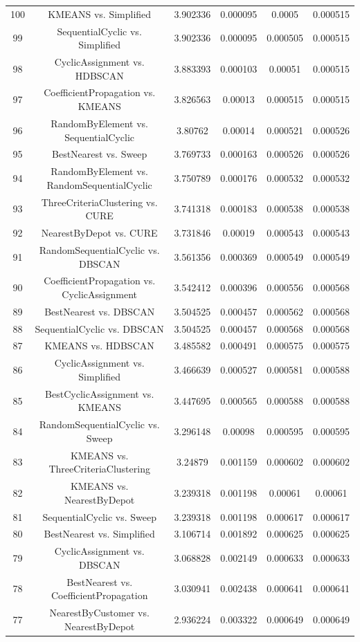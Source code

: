\documentclass[a4paper,10pt]{article}
\begin{document}
\begin{landscape}
\begin{table}[!htp]
\begin{tabular}{cccccc}
100&KMEANS vs. Simplified&3.902336&0.000095&0.0005&0.000515\\
99&SequentialCyclic vs. Simplified&3.902336&0.000095&0.000505&0.000515\\
98&CyclicAssignment vs. HDBSCAN&3.883393&0.000103&0.00051&0.000515\\
97&CoefficientPropagation vs. KMEANS&3.826563&0.00013&0.000515&0.000515\\
96&RandomByElement vs. SequentialCyclic&3.80762&0.00014&0.000521&0.000526\\
95&BestNearest vs. Sweep&3.769733&0.000163&0.000526&0.000526\\
94&RandomByElement vs. RandomSequentialCyclic&3.750789&0.000176&0.000532&0.000532\\
93&ThreeCriteriaClustering vs. CURE&3.741318&0.000183&0.000538&0.000538\\
92&NearestByDepot vs. CURE&3.731846&0.00019&0.000543&0.000543\\
91&RandomSequentialCyclic vs. DBSCAN&3.561356&0.000369&0.000549&0.000549\\
90&CoefficientPropagation vs. CyclicAssignment&3.542412&0.000396&0.000556&0.000568\\
89&BestNearest vs. DBSCAN&3.504525&0.000457&0.000562&0.000568\\
88&SequentialCyclic vs. DBSCAN&3.504525&0.000457&0.000568&0.000568\\
87&KMEANS vs. HDBSCAN&3.485582&0.000491&0.000575&0.000575\\
86&CyclicAssignment vs. Simplified&3.466639&0.000527&0.000581&0.000588\\
85&BestCyclicAssignment vs. KMEANS&3.447695&0.000565&0.000588&0.000588\\
84&RandomSequentialCyclic vs. Sweep&3.296148&0.00098&0.000595&0.000595\\
83&KMEANS vs. ThreeCriteriaClustering&3.24879&0.001159&0.000602&0.000602\\
82&KMEANS vs. NearestByDepot&3.239318&0.001198&0.00061&0.00061\\
81&SequentialCyclic vs. Sweep&3.239318&0.001198&0.000617&0.000617\\
80&BestNearest vs. Simplified&3.106714&0.001892&0.000625&0.000625\\
79&CyclicAssignment vs. DBSCAN&3.068828&0.002149&0.000633&0.000633\\
78&BestNearest vs. CoefficientPropagation&3.030941&0.002438&0.000641&0.000641\\
77&NearestByCustomer vs. NearestByDepot&2.936224&0.003322&0.000649&0.000649\\

\end{tabular}
\end{table}
\end{landscape}
\end{document}
